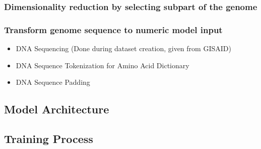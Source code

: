 \subsubsection{Dimensionality reduction by selecting subpart of the genome}
\label{ch:approachBa}


\subsubsection{Transform genome sequence to numeric model input}
\label{ch:approachBb}


\begin{itemize}
	\item DNA Sequencing (Done during dataset creation, given from GISAID)
	\item DNA Sequence Tokenization for Amino Acid Dictionary
	\item DNA Sequence Padding
\end{itemize}

\subsection{Model Architecture}  \label{ch:approachC}

\subsection{Training Process} \label{ch:approachD}

\newpage
